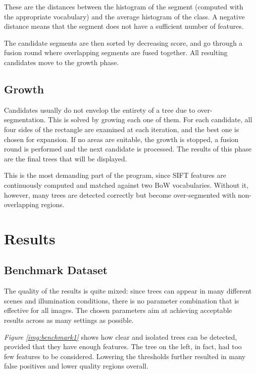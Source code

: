 \documentclass{article}
\begin{document}
These are the distances between the histogram of the segment (computed with the appropriate vocabulary) and the average histogram of the class.
A negative distance means that the segment does not have a sufficient number of features.

The candidate segments are then sorted by decreasing score, and go through a fusion round where overlapping segments are fused together. All resulting candidates move to the growth phase.

\subsection{Growth}
Candidates usually do not envelop the entirety of a tree due to over-segmentation. This is solved by growing each one of them.
For each candidate, all four sides of the rectangle are examined at each iteration, and the best one is chosen for expansion. If no areas are suitable, the growth is stopped, a fusion round is performed and the next candidate is processed.
The results of this phase are the final trees that will be displayed.

This is the most demanding part of the program, since SIFT features are continuously computed and matched against two BoW vocabularies. Without it, however, many trees are detected correctly but become over-segmented with non-overlapping regions.

\section{Results}
\subsection{Benchmark Dataset}
The quality of the results is quite mixed: since trees can appear in many different scenes and illumination conditions, there is no parameter combination that is effective for all images.
The chosen parameters aim at achieving acceptable results across as many settings as possible.

\textit{Figure \ref{img:benchmark1}} shows how clear and isolated trees can be detected, provided that they have enough features. The tree on the left, in fact, had too few features to be considered. Lowering the thresholds further resulted in many false positives and lower quality regions overall.
\end{document}
